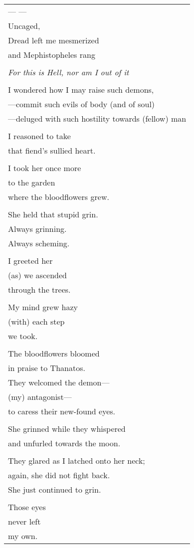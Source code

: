 \documentclass{article}
\begin{document}
\begin{tabular}{l}
\\
--- --- \\
Uncaged, \\
Dread left me mesmerized \\
and Mephistopheles rang \\
\\
\textit{For this is Hell, nor am I out of it} \\
\\
I wondered how I may raise such demons, \\
---commit such evils of body (and of soul) \\
---deluged with such hostility towards (fellow) man \\
\\
I reasoned to take \\
that fiend's sullied heart. \\
\\
I took her once more \\
to the garden \\
where the bloodflowers grew. \\
\\
She held that stupid grin. \\
Always grinning. \\
Always scheming. \\
\\
I greeted her \\
(as) we ascended \\
through the trees. \\
\\
My mind grew hazy \\
(with) each step \\
we took. \\
\\
The bloodflowers bloomed \\
in praise to Thanatos. \\
They welcomed the demon--- \\
(my) antagonist--- \\
to caress their new-found eyes. \\
\\
She grinned while they whispered \\
and unfurled towards the moon. \\
\\
They glared as I latched onto her neck; \\
again, she did not fight back. \\
She just continued to grin. \\
\\
Those eyes \\
never left \\
my own. \\
\end{tabular} \\
\end{document}
